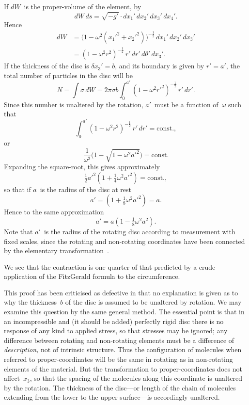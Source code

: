 \documentclass[12pt]{book}
\begin{document}
If $dW$~is the proper-volume of the element, by~
\[
dW\, ds = \sqrt{-g'} \cdot dx_{1}'\, dx_{2}'\, dx_{3}'\, dx_{4}'.
\]
Hence
\begin{align*}
  dW &= \bigl(1 - \omega^{2}(x_{1}'^{2} + x_{2}'^{2})\bigr)^{-\frac{1}{2}}\, dx_{1}'\, dx_{2}'\, dx_{3}' \\
  &= (1 - \omega^{2} r^{2})^{-\frac{1}{2}}\, r'\, dr'\, d\theta'\, dx_{3}'.
\end{align*}
If the thickness of the disc is $\delta x_{3}' = b$, and its boundary is given by $r' = a'$,
the total number of particles in the disc will be
\[
N = \int \sigma\, dW
= 2\pi\sigma b \int_{0}^{a'} (1 - \omega^{2} r'^{2})^{-\frac{1}{2}}\, r'\, dr'.
\]
Since this number is unaltered by the rotation, $a'$~must be a function of~$\omega$
such that
\[
\int_{0}^{a'} (1 - \omega^{2} r^{2})^{-\frac{1}{2}}\, r'\, dr' = \text{const.},
\]
or
\[
\frac{1}{\omega^{2}}\bigl(1 - \sqrt{1 - \omega^{2} a'^{2}}\bigr) = \text{const.}
\]
Expanding the square-root, this gives approximately
\[
\tfrac{1}{2} a'^{2} (1 + \tfrac{1}{4} \omega^{2} a'^{2}) = \text{const.},
\]
so that if $a$~is the radius of the disc at rest
\[
a' = (1 + \tfrac{1}{8} \omega^{2} a'^{2}) = a.
\]
Hence to the same approximation
\[
a' = a (1 - \tfrac{1}{8} \omega^{2} a^{2}).
\]
Note that $a'$~is the radius of the rotating disc according to measurement with
fixed scales, since the rotating and non-rotating coordinates have been connected
by the elementary transformation~.

We see that the contraction is one quarter of that predicted by a crude
application of the FitzGerald formula to the circumference.

This proof has been criticised as defective in that no explanation is given as to why the thickness~$b$ of the disc
is assumed to be unaltered by rotation.
We may examine this question by the same general method.
The essential point is that in an incompressible and (it should be added) perfectly rigid disc there is no response
of any kind to applied stress, so that stresses may be ignored;
any difference between rotating and non-rotating elements must be a difference of \emph{description,} not of
intrinsic structure.
Thus the configuration of molecules when referred to proper-coordinates will be the same in rotating as in
non-rotating elements of the material.
But the transformation to proper-coordinates does not affect~$x_3$, so that the spacing of the molecules along this
coordinate is unaltered by the rotation.
The thickness of the disc---or length of the chain of molecules extending from the lower to the
upper surface---is accordingly unaltered.
\end{document}
